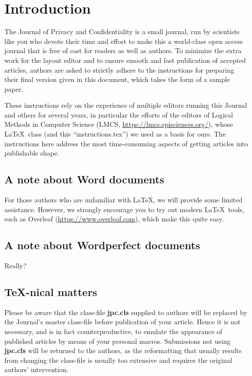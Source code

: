 \documentclass{jpc} %
\theoremstyle{plain}\newtheorem{satz}[thm]{Satz} %
\begin{document}
\maketitle

\section*{Introduction}\label{S:one}

  The Journal of Privacy and Confidentiality is a small journal, run
  by scientists like you who devote their time and effort to make this
  a world-class open access journal that is free of cost for readers
  as well as authors.  To minimize the extra work for the layout
  editor and to ensure smooth and fast publication of accepted
  articles, authors are asked to strictly adhere to the instructions
  for preparing their final version given in this document, which
  takes the form of a sample paper.

  These instructions rely on the experience of multiple editors running this
  Journal and others for several years, in particular the efforts of the editors of Logical Methods in Computer Science (LMCS, \url{https://lmcs.episciences.org/}), whose \LaTeX\  class (and this   ``instructions.tex'') we used as a basis for ours.  The instructions here address the most time-consuming
  aspects of getting articles into publishable shape.

\subsection*{A note about Word documents}
For those authors who are unfamiliar with \LaTeX, we will provide some limited assistance. However, we strongly encourage you to try out modern \LaTeX\  tools, such as Overleaf (\url{https://www.overleaf.com}), which make this quite easy.


\subsection*{A note about Wordperfect documents}
Really?

\subsection*{\TeX-nical matters}

  Please be aware that the class-file {\bf jpc.cls} supplied to
  authors will be replaced by the Journal's master class-file before
  publication of your article.  Hence it is not necessary, and is in
  fact counterproductive, to emulate the appearance of published
  articles by means of your personal macros.  Submissions not using
  {\bf jpc.cls} will be returned to the authors, as the reformatting
  that usually results from changing the class-file is usually too
  extensive and requires the original authors' intervention.
\end{document}
